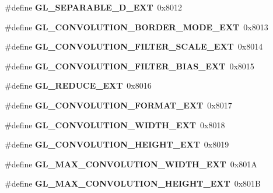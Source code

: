 \begin{DoxyCompactItemize}
\item 
\#define {\bfseries G\+L\+\_\+\+S\+E\+P\+A\+R\+A\+B\+L\+E\+\_\+D\+\_\+\+E\+X\+T}~0x8012\label{_s_d_l__opengl_8h_a435dd55b0629d8a491970f987231abe1}

\item 
\#define {\bfseries G\+L\+\_\+\+C\+O\+N\+V\+O\+L\+U\+T\+I\+O\+N\+\_\+\+B\+O\+R\+D\+E\+R\+\_\+\+M\+O\+D\+E\+\_\+\+E\+X\+T}~0x8013\label{_s_d_l__opengl_8h_a296eeaae35cc5502f588c0cb29831b20}

\item 
\#define {\bfseries G\+L\+\_\+\+C\+O\+N\+V\+O\+L\+U\+T\+I\+O\+N\+\_\+\+F\+I\+L\+T\+E\+R\+\_\+\+S\+C\+A\+L\+E\+\_\+\+E\+X\+T}~0x8014\label{_s_d_l__opengl_8h_a467ee88e8fd48327d8216589e88803fb}

\item 
\#define {\bfseries G\+L\+\_\+\+C\+O\+N\+V\+O\+L\+U\+T\+I\+O\+N\+\_\+\+F\+I\+L\+T\+E\+R\+\_\+\+B\+I\+A\+S\+\_\+\+E\+X\+T}~0x8015\label{_s_d_l__opengl_8h_adeeba35f270133716adee4de6505458c}

\item 
\#define {\bfseries G\+L\+\_\+\+R\+E\+D\+U\+C\+E\+\_\+\+E\+X\+T}~0x8016\label{_s_d_l__opengl_8h_a4101fa51db9ed1f3980f40d7be7563b2}

\item 
\#define {\bfseries G\+L\+\_\+\+C\+O\+N\+V\+O\+L\+U\+T\+I\+O\+N\+\_\+\+F\+O\+R\+M\+A\+T\+\_\+\+E\+X\+T}~0x8017\label{_s_d_l__opengl_8h_a40991780c33f434e075092e2705d4133}

\item 
\#define {\bfseries G\+L\+\_\+\+C\+O\+N\+V\+O\+L\+U\+T\+I\+O\+N\+\_\+\+W\+I\+D\+T\+H\+\_\+\+E\+X\+T}~0x8018\label{_s_d_l__opengl_8h_a30a25289aa610ca37ad5fad5534211ef}

\item 
\#define {\bfseries G\+L\+\_\+\+C\+O\+N\+V\+O\+L\+U\+T\+I\+O\+N\+\_\+\+H\+E\+I\+G\+H\+T\+\_\+\+E\+X\+T}~0x8019\label{_s_d_l__opengl_8h_ac9c8dfbc399f7d99feee34e74d82cdfc}

\item 
\#define {\bfseries G\+L\+\_\+\+M\+A\+X\+\_\+\+C\+O\+N\+V\+O\+L\+U\+T\+I\+O\+N\+\_\+\+W\+I\+D\+T\+H\+\_\+\+E\+X\+T}~0x801\+A\label{_s_d_l__opengl_8h_ace854e040a07ad50b4442c9c82c0c9b2}

\item 
\#define {\bfseries G\+L\+\_\+\+M\+A\+X\+\_\+\+C\+O\+N\+V\+O\+L\+U\+T\+I\+O\+N\+\_\+\+H\+E\+I\+G\+H\+T\+\_\+\+E\+X\+T}~0x801\+B\label{_s_d_l__opengl_8h_a2f1cf69a9ee2712f3229481c21e2c1d8}


\end{DoxyCompactItemize}
